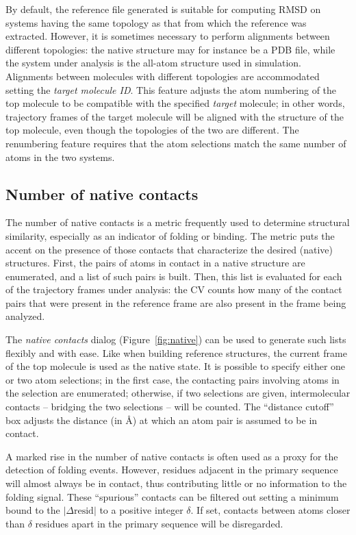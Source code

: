 \documentclass[preprint,12pt]{elsarticle}
\begin{document}
By default, the reference file generated is suitable for computing
RMSD on systems having the same topology as that from which the
reference was extracted.  However, it is sometimes necessary to
perform alignments between different topologies: the native structure
may for instance be a PDB file, while the system under analysis is the
all-atom structure used in simulation. Alignments between molecules
with different topologies are accommodated setting the \emph{target
  molecule ID}. This feature adjusts the atom numbering of the top
molecule to be compatible with the specified \emph{target} molecule;
in other words, trajectory frames of the target molecule will be
aligned with the structure of the top molecule, even though the
topologies of the two are different. The renumbering feature requires
that the atom selections match the same number of atoms in the two
systems.





\subsection{Number of native contacts}

The number of native contacts is a metric  frequently used to
determine structural similarity, especially as an indicator of folding
or binding.  The metric puts the accent on the presence of those
contacts that characterize the desired (native) structures. First, the
pairs of atoms in contact in a native structure are
enumerated, and a list of such pairs is built. Then, this list is evaluated
for each of the trajectory frames under analysis: the 
CV counts how many of the contact pairs that were present in the
reference frame are also present in the frame being analyzed.  

The \emph{native contacts} dialog (Figure~\ref{fig:native}) can be
used to generate such lists flexibly and with ease. Like when building
reference structures, the current frame of the top molecule is used as
the native state.  It is possible to specify either one or two atom
selections; in the first case, the contacting pairs involving atoms in
the selection are enumerated; otherwise, if two selections are given,
intermolecular contacts -- bridging the two selections -- will be
counted.  The ``distance cutoff'' box adjusts the distance (in \AA) at
which an atom pair is assumed to be in contact.

A marked rise in the number of native contacts is often used as a
proxy for the detection of folding events. However, residues adjacent
in the primary sequence will almost always be in contact, thus
contributing little or no information to the folding signal. These
``spurious'' contacts can be filtered out setting a minimum bound to
the $| \Delta \mbox{resid} |$ to a positive integer $\delta$. If set,
contacts between atoms closer than $\delta$ residues apart in the
primary sequence will be disregarded.
\end{document}
